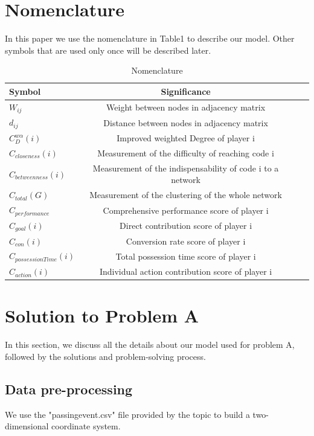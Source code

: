 \documentclass{mcmthesis}
\begin{document}
\section{Nomenclature}
In this paper we use the nomenclature in Table1 to describe our model. Other symbols that are used only once will be described later.
\begin{table}[htbp]
\centering  %
\begin{tabular}{lccc}  %
\hline
Symbol &Significance\\ \hline  %

$W_{ij}$ &Weight between nodes in adjacency matrix \\         
$d_{ij}$ &Distance between nodes in adjacency matrix \\ 
$C_{D}^{w\alpha}\left(i\right)$ &Improved weighted Degree of player i\\        %
$C_{closeness}\left(i\right)$ &Measurement of the difficulty of reaching code i \\ 
$C_{betweenness}\left(i\right)$ &Measurement of the indispensability of code i to a network\\ 
$C_{total}\left(G\right)$ & Measurement of the clustering of the whole network\\ 
$C_{performance}$ &Comprehensive performance score of player i \\
$C_{goal}\left(i\right)$ &Direct contribution score of player i \\
$C_{con}\left(i\right)$ &Conversion rate score of player i\\
$C_{possessionTime }\left(i\right)$ &Total possession time score of player i\\
$C_{action}\left(i\right)$ &Individual action contribution score of player i\\ 

\hline
\end{tabular}
\caption{Nomenclature}
\end{table}
\section{ Solution to Problem A }
In this section, we discuss all the details about our model used for problem A, followed by the solutions and problem-solving process.
\subsection{Data pre-processing}%
We use the "passingevent.csv" file provided by the topic to build a two-dimensional coordinate system.
\end{document}
